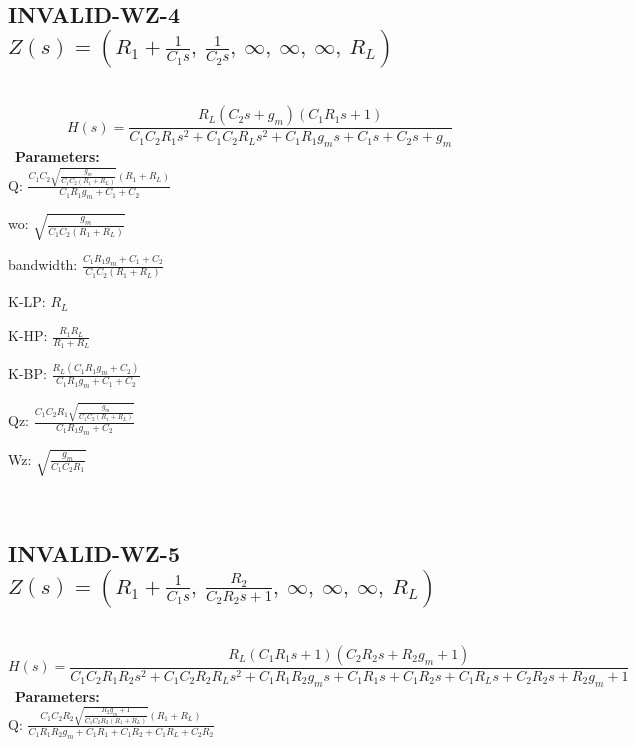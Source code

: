 \documentclass{article}
\begin{document}
\ 

\subsection{INVALID-WZ-4 $Z(s) = \left( R_{1} + \frac{1}{C_{1} s}, \  \frac{1}{C_{2} s}, \  \infty, \  \infty, \  \infty, \  R_{L}\right)$ } \ 
\textbf{\[H(s) = \frac{R_{L} \left(C_{2} s + g_{m}\right) \left(C_{1} R_{1} s + 1\right)}{C_{1} C_{2} R_{1} s^{2} + C_{1} C_{2} R_{L} s^{2} + C_{1} R_{1} g_{m} s + C_{1} s + C_{2} s + g_{m}}\] } \ 
\textbf{Parameters:}\\ 

Q: $\frac{C_{1} C_{2} \sqrt{\frac{g_{m}}{C_{1} C_{2} \left(R_{1} + R_{L}\right)}} \left(R_{1} + R_{L}\right)}{C_{1} R_{1} g_{m} + C_{1} + C_{2}}$\ 

wo: $\sqrt{\frac{g_{m}}{C_{1} C_{2} \left(R_{1} + R_{L}\right)}}$\ 

bandwidth: $\frac{C_{1} R_{1} g_{m} + C_{1} + C_{2}}{C_{1} C_{2} \left(R_{1} + R_{L}\right)}$\ 

K-LP: $R_{L}$\ 

K-HP: $\frac{R_{1} R_{L}}{R_{1} + R_{L}}$\ 

K-BP: $\frac{R_{L} \left(C_{1} R_{1} g_{m} + C_{2}\right)}{C_{1} R_{1} g_{m} + C_{1} + C_{2}}$\ 

Qz: $\frac{C_{1} C_{2} R_{1} \sqrt{\frac{g_{m}}{C_{1} C_{2} \left(R_{1} + R_{L}\right)}}}{C_{1} R_{1} g_{m} + C_{2}}$\ 

Wz: $\sqrt{\frac{g_{m}}{C_{1} C_{2} R_{1}}}$\ 

\ 

\subsection{INVALID-WZ-5 $Z(s) = \left( R_{1} + \frac{1}{C_{1} s}, \  \frac{R_{2}}{C_{2} R_{2} s + 1}, \  \infty, \  \infty, \  \infty, \  R_{L}\right)$ } \ 
\textbf{\[H(s) = \frac{R_{L} \left(C_{1} R_{1} s + 1\right) \left(C_{2} R_{2} s + R_{2} g_{m} + 1\right)}{C_{1} C_{2} R_{1} R_{2} s^{2} + C_{1} C_{2} R_{2} R_{L} s^{2} + C_{1} R_{1} R_{2} g_{m} s + C_{1} R_{1} s + C_{1} R_{2} s + C_{1} R_{L} s + C_{2} R_{2} s + R_{2} g_{m} + 1}\] } \ 
\textbf{Parameters:}\\ 

Q: $\frac{C_{1} C_{2} R_{2} \sqrt{\frac{R_{2} g_{m} + 1}{C_{1} C_{2} R_{2} \left(R_{1} + R_{L}\right)}} \left(R_{1} + R_{L}\right)}{C_{1} R_{1} R_{2} g_{m} + C_{1} R_{1} + C_{1} R_{2} + C_{1} R_{L} + C_{2} R_{2}}$\ 
\end{document}
